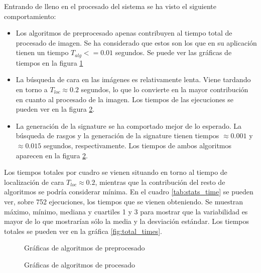 Entrando de lleno en el procesado del sistema se ha visto el siguiente comportamiento:
\begin{itemize}
	\item{Los algoritmos de preprocesado apenas contribuyen al tiempo total de procesado de imagen. Se ha considerado que estos son los que en su aplicación tienen un tiempo $T_{alg}<=0.01$ segundos. Se puede ver las gráficas de tiempos en la figura \ref{fig:preproc_times}}
	\item{La búsqueda de cara en las imágenes es relativamente lenta. Viene tardando en torno a $T_{loc}\approx0.2$ segundos, lo que lo convierte en la mayor contribución en cuanto al procesado de la imagen. Los tiempos de las ejecuciones se pueden ver en la figura \ref{fig:proc_times}.}
	\item{La generación de la signature se ha comportado mejor de lo esperado. La búsqueda de rasgos y la generación de la signature tienen tiempos $\approx0.001$ y $\approx0.015$ segundos, respectivamente. Los tiempos de ambos algoritmos aparecen en la figura \ref{fig:proc_times}.}
\end{itemize}



Los tiempos totales por cuadro se vienen situando en torno al tiempo de localización de cara $T_{loc}\approx0.2$, mientras que la contribución del resto de algoritmos se podría considerar mínima. En el cuadro \ref{tab:stats_time} se pueden ver, sobre 752 ejecuciones, los tiempos que se vienen obteniendo. Se muestran máximo, mínimo, mediana y cuartiles 1 y 3 para mostrar que la variabilidad es mayor de lo que mostrarían sólo la media y la desviación estándar. Los tiempos totales se pueden ver en la gráfica \ref{fig:total_times}.

\begin{figure}[!hb]
        \centering
		\resizebox{7.25cm}{!}{}
		\resizebox{7.25cm}{!}{}
		\resizebox{10cm}{!}{}
        \caption{Gráficas de algoritmos de preprocesado}
        \label{fig:preproc_times}
\end{figure}

\begin{figure}[!hb]
        \centering
		\resizebox{7.25cm}{!}{}
		\resizebox{7.25cm}{!}{}
		\resizebox{10cm}{!}{}
        \caption{Gráficas de algoritmos de procesado}
        \label{fig:proc_times}
\end{figure}


